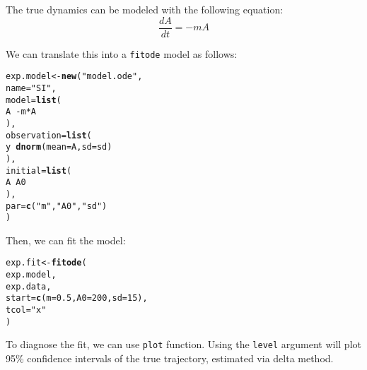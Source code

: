 \documentclass{article}\usepackage[]{graphicx}\usepackage[]{color}
\makeatletter
\newcommand{\hlnum}[1]{\textcolor[rgb]{0.686,0.059,0.569}{#1}}%
\newcommand{\hlstr}[1]{\textcolor[rgb]{0.192,0.494,0.8}{#1}}%
\newcommand{\hlopt}[1]{\textcolor[rgb]{0,0,0}{#1}}%
\newcommand{\hlstd}[1]{\textcolor[rgb]{0.345,0.345,0.345}{#1}}%
\newcommand{\hlkwb}[1]{\textcolor[rgb]{0.69,0.353,0.396}{#1}}%
\newcommand{\hlkwc}[1]{\textcolor[rgb]{0.333,0.667,0.333}{#1}}%
\newcommand{\hlkwd}[1]{\textcolor[rgb]{0.737,0.353,0.396}{\textbf{#1}}}%
\newenvironment{kframe}{%
 \def\at@end@of@kframe{}%
 \ifinner\ifhmode%
  \def\at@end@of@kframe{\end{minipage}}%
  \begin{minipage}{\columnwidth}%
 \fi\fi%
 \def\FrameCommand##1{\hskip\@totalleftmargin \hskip-\fboxsep
 \colorbox{shadecolor}{##1}\hskip-\fboxsep
     \hskip-\linewidth \hskip-\@totalleftmargin \hskip\columnwidth}%
 \MakeFramed {\advance\hsize-\width
   \@totalleftmargin\z@ \linewidth\hsize
   \@setminipage}}%
 {\par\unskip\endMakeFramed%
 \at@end@of@kframe}
\newenvironment{knitrout}{}{} %
\newcommand{\code}[1]{{\tt #1}}
\makeatother
\begin{document}
The true dynamics can be modeled with the following equation:
$$
\frac{dA}{dt} = - m A
$$

We can translate this into a \code{fitode} model as follows:

\begin{knitrout}
\color{fgcolor}\begin{kframe}
\begin{alltt}
\hlstd{exp.model} \hlkwb{<-} \hlkwd{new}\hlstd{(}\hlstr{"model.ode"}\hlstd{,}
    \hlkwc{name} \hlstd{=} \hlstr{"SI"}\hlstd{,}
    \hlkwc{model} \hlstd{=} \hlkwd{list}\hlstd{(}
        \hlstd{A} \hlopt{~ -}\hlstd{m} \hlopt{*} \hlstd{A}
    \hlstd{),}
    \hlkwc{observation} \hlstd{=} \hlkwd{list}\hlstd{(}
        \hlstd{y} \hlopt{~} \hlkwd{dnorm}\hlstd{(}\hlkwc{mean}\hlstd{=A,} \hlkwc{sd}\hlstd{=sd)}
    \hlstd{),}
    \hlkwc{initial} \hlstd{=} \hlkwd{list}\hlstd{(}
        \hlstd{A} \hlopt{~} \hlstd{A0}
    \hlstd{),}
    \hlkwc{par}\hlstd{=}\hlkwd{c}\hlstd{(}\hlstr{"m"}\hlstd{,} \hlstr{"A0"}\hlstd{,} \hlstr{"sd"}\hlstd{)}
\hlstd{)}
\end{alltt}
\end{kframe}
\end{knitrout}

Then, we can fit the model:

\begin{knitrout}
\color{fgcolor}\begin{kframe}
\begin{alltt}
\hlstd{exp.fit} \hlkwb{<-} \hlkwd{fitode}\hlstd{(}
    \hlstd{exp.model,}
    \hlstd{exp.data,}
    \hlkwc{start}\hlstd{=}\hlkwd{c}\hlstd{(}\hlkwc{m}\hlstd{=}\hlnum{0.5}\hlstd{,} \hlkwc{A0}\hlstd{=}\hlnum{200}\hlstd{,} \hlkwc{sd}\hlstd{=}\hlnum{15}\hlstd{),}
    \hlkwc{tcol}\hlstd{=}\hlstr{"x"}
\hlstd{)}
\end{alltt}


{\ttfamily\noindent\itshape\color{messagecolor}{\#\# Fitting ode ...}}

{\ttfamily\noindent\itshape\color{messagecolor}{\#\# Computing vcov on the original scale ...}}\end{kframe}
\end{knitrout}

To diagnose the fit, we can use \code{plot} function.
Using the \code{level} argument will plot 95\% confidence intervals of the true trajectory, estimated via delta method.
\end{document}
